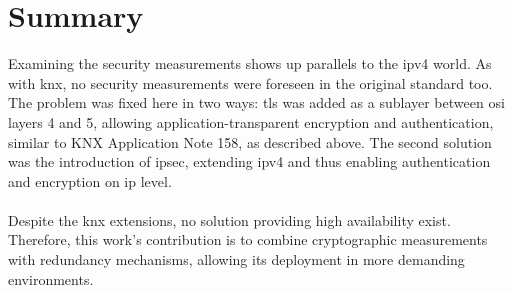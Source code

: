 \section{Summary}
Examining the security measurements shows up parallels to the \gls{ipv4} world. As with \gls{knx}, no security measurements were foreseen in the
original standard too. The problem was
fixed here in two ways: \gls{tls} was added as a sublayer between \gls{osi} layers 4 and 5, allowing application-transparent encryption and authentication, 
similar to KNX Application Note 158, as described above. The second solution was the introduction of \gls{ipsec}, extending \gls{ipv4} and thus enabling authentication and encryption on \gls{ip} level.
\\
\\
Despite the \gls{knx} extensions, no solution providing high availability exist. Therefore, this work's contribution is to combine cryptographic measurements with
redundancy mechanisms, allowing its deployment in more demanding environments.